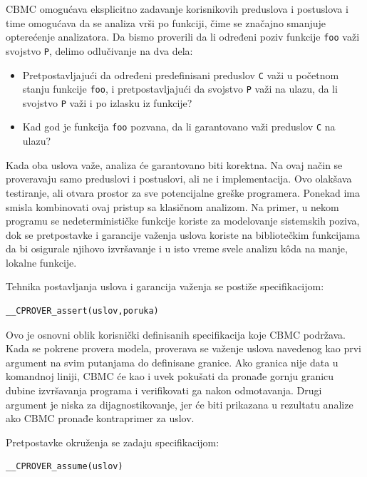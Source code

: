 CBMC omogućava eksplicitno zadavanje korisnikovih preduslova i postuslova i time omogućava da se analiza vrši po funkciji, čime se značajno smanjuje opterećenje analizatora. Da bismo proverili da li određeni poziv funkcije \texttt{foo} važi svojstvo \texttt{P}, delimo odlučivanje na dva dela:

\begin{itemize}
\tightlist
\item
  Pretpostavljajući da određeni predefinisani preduslov \texttt{C} važi u početnom stanju funkcije \texttt{foo}, i pretpostavljajući da svojstvo \texttt{P} važi na ulazu, da li svojstvo \texttt{P} važi i po izlasku iz funkcije?
\item
  Kad god je funkcija \texttt{foo} pozvana, da li garantovano važi preduslov \texttt{C} na ulazu?
\end{itemize}

Kada oba uslova važe, analiza će garantovano biti korektna. Na ovaj način se proveravaju samo preduslovi i postuslovi, ali ne i implementacija. Ovo olakšava testiranje, ali otvara prostor za sve potencijalne greške programera. Ponekad ima smisla kombinovati ovaj pristup sa klasičnom analizom. Na primer, u nekom programu se nedeterminističke funkcije koriste za modelovanje sistemskih poziva, dok se pretpostavke i garancije važenja uslova koriste na bibliotečkim funkcijama da bi osigurale njihovo izvršavanje i u isto vreme svele analizu kôda na manje, lokalne funkcije.

Tehnika postavljanja uslova i garancija važenja se postiže specifikacijom:

\begin{verbatim}
__CPROVER_assert(uslov,poruka)
\end{verbatim}

Ovo je osnovni oblik korisnički definisanih specifikacija koje CBMC podržava. Kada se pokrene provera modela, proverava se važenje uslova navedenog kao prvi argument na svim putanjama do definisane granice. Ako granica nije data u komandnoj liniji, CBMC će kao i uvek pokušati da pronađe gornju granicu dubine izvršavanja programa i verifikovati ga nakon odmotavanja. Drugi argument je niska za dijagnostikovanje, jer će biti prikazana u rezultatu analize ako CBMC pronađe kontraprimer za uslov.

Pretpostavke okruženja se zadaju specifikacijom:

\begin{verbatim}
__CPROVER_assume(uslov)
\end{verbatim}

